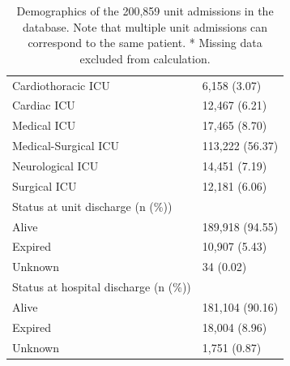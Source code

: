 \documentclass[english]{article}
\begin{document}
\begin{table}
\begin{tabular}{l|p{7cm}}
\hspace{0.5cm} Cardiothoracic ICU & 6,158 (3.07) \\
\hspace{0.5cm} Cardiac ICU & 12,467 (6.21) \\
\hspace{0.5cm} Medical ICU & 17,465 (8.70) \\
\hspace{0.5cm} Medical-Surgical ICU & 113,222 (56.37) \\
\hspace{0.5cm} Neurological ICU & 14,451 (7.19) \\
\hspace{0.5cm} Surgical ICU & 12,181 (6.06) \\
Status at unit discharge (n (\%)) & \\
\hspace{0.5cm} Alive & 189,918 (94.55) \\
\hspace{0.5cm} Expired & 10,907 (5.43) \\
\hspace{0.5cm} Unknown & 34 (0.02) \\
Status at hospital discharge (n (\%)) & \\
\hspace{0.5cm} Alive & 181,104 (90.16) \\
\hspace{0.5cm} Expired & 18,004 (8.96) \\
\hspace{0.5cm} Unknown & 1,751 (0.87) \\
\hline
\end{tabular}
\caption{Demographics of the 200,859 unit admissions in the database.
Note that multiple unit admissions can correspond to the same patient. *
Missing data excluded from calculation.
\label{tab:demographics}}
\end{table}

\end{document}
